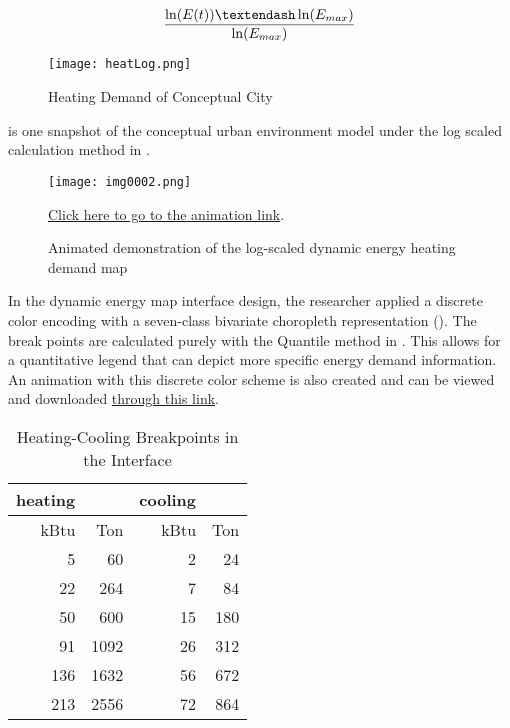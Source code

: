 \begin{equation}\label{eq:log}
  {\ln(E(t)) – \ln(E_{max}) \over \ln(E_{max})}
\end{equation}

\begin{figure}[h!]
  \centering
  \texttt{[image: heatLog.png]}
  \caption[Heating Demand of Conceptual City]{Heating Demand of
    Conceptual City}
  \label{fig:heatLog}
\end{figure}

 is one snapshot of the conceptual urban environment
model under the log scaled calculation method in .
\begin{figure}[h!]
  \centering
  \texttt{[image: img0002.png]}
  \caption[Animation Demo of the Color Calculation]{Animated
    demonstration of the log-scaled dynamic energy heating demand map}
  \label{fig:img0002}
  \href{http://www.armechxyj.com/energy-mapping.html/#colorAnime}{Click
    here to go to the animation link}.
\end{figure}

In the dynamic energy map interface design, the researcher applied a
discrete color encoding with a seven-class bivariate choropleth
representation (). The break points are
calculated purely with the Quantile method in
. This allows for a quantitative legend that
can depict more specific energy demand information. An animation with
this discrete color scheme is also created and can be viewed and
downloaded
\href{http://www.armechxyj.com/energy-mapping.html#redblueAnime3d}{through
  this link}.

\begin{table}[]
\centering
\caption{Heating-Cooling Breakpoints in the Interface}
\label{tab:breakpoint}
\begin{tabular}{rr|rr}
  \hline
heating &      & cooling &     \\
  \hline
  \hline
kBtu    & Ton  & kBtu    & Ton \\
5       & 60   & 2       & 24  \\
22      & 264  & 7       & 84  \\
50      & 600  & 15      & 180 \\
91      & 1092 & 26      & 312 \\
136     & 1632 & 56      & 672 \\
213     & 2556 & 72      & 864\\
  \hline
\end{tabular}
\end{table}

